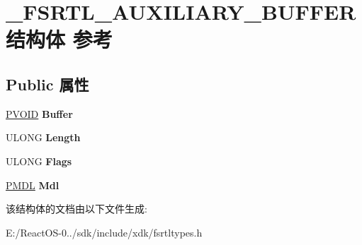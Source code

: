 \hypertarget{struct___f_s_r_t_l___a_u_x_i_l_i_a_r_y___b_u_f_f_e_r}{}\section{\+\_\+\+F\+S\+R\+T\+L\+\_\+\+A\+U\+X\+I\+L\+I\+A\+R\+Y\+\_\+\+B\+U\+F\+F\+E\+R结构体 参考}
\label{struct___f_s_r_t_l___a_u_x_i_l_i_a_r_y___b_u_f_f_e_r}
\subsection*{Public 属性}
\begin{DoxyCompactItemize}
\item 
\mbox{\label{struct___f_s_r_t_l___a_u_x_i_l_i_a_r_y___b_u_f_f_e_r_a1e1dc666d5161bea4bdc1ff1f2cf11d8}} 
\hyperlink{interfacevoid}{P\+V\+O\+ID} {\bfseries Buffer}
\item 
\mbox{\label{struct___f_s_r_t_l___a_u_x_i_l_i_a_r_y___b_u_f_f_e_r_af5c654df80c96c55af5c8c795ae37c8e}} 
U\+L\+O\+NG {\bfseries Length}
\item 
\mbox{\label{struct___f_s_r_t_l___a_u_x_i_l_i_a_r_y___b_u_f_f_e_r_a87649b9a5bd5cbd94d8c4a1b4682ddb9}} 
U\+L\+O\+NG {\bfseries Flags}
\item 
\mbox{\label{struct___f_s_r_t_l___a_u_x_i_l_i_a_r_y___b_u_f_f_e_r_a36a1192494bcaf7a7f14aadfe1d49d7c}} 
\hyperlink{interfacevoid}{P\+M\+DL} {\bfseries Mdl}
\end{DoxyCompactItemize}


该结构体的文档由以下文件生成\+:\begin{DoxyCompactItemize}
\item 
E\+:/\+React\+O\+S-\/0../sdk/include/xdk/fsrtltypes.\+h\end{DoxyCompactItemize}
